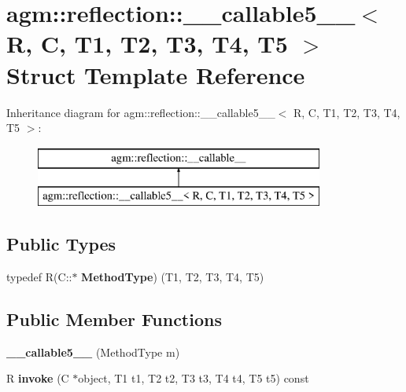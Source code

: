 \hypertarget{structagm_1_1reflection_1_1____callable5____}{}\section{agm\+:\+:reflection\+:\+:\+\_\+\+\_\+callable5\+\_\+\+\_\+$<$ R, C, T1, T2, T3, T4, T5 $>$ Struct Template Reference}
\label{structagm_1_1reflection_1_1____callable5____}
Inheritance diagram for agm\+:\+:reflection\+:\+:\+\_\+\+\_\+callable5\+\_\+\+\_\+$<$ R, C, T1, T2, T3, T4, T5 $>$\+:\begin{figure}[H]
\begin{center}
\leavevmode
\includegraphics[height=2.000000cm]{structagm_1_1reflection_1_1____callable5____}
\end{center}
\end{figure}
\subsection*{Public Types}
\begin{DoxyCompactItemize}
\item 
typedef R(C\+::$\ast$ {\bfseries Method\+Type}) (T1, T2, T3, T4, T5)\hypertarget{structagm_1_1reflection_1_1____callable5_____a8417118cba653d6e2d0fb0104980759c}{}\label{structagm_1_1reflection_1_1____callable5_____a8417118cba653d6e2d0fb0104980759c}

\end{DoxyCompactItemize}
\subsection*{Public Member Functions}
\begin{DoxyCompactItemize}
\item 
{\bfseries \+\_\+\+\_\+callable5\+\_\+\+\_\+} (Method\+Type m)\hypertarget{structagm_1_1reflection_1_1____callable5_____afa2ebe77e38218a8d0910781d073a704}{}\label{structagm_1_1reflection_1_1____callable5_____afa2ebe77e38218a8d0910781d073a704}

\item 
R {\bfseries invoke} (C $\ast$object, T1 t1, T2 t2, T3 t3, T4 t4, T5 t5) const \hypertarget{structagm_1_1reflection_1_1____callable5_____a5f71fd34743be37d7fbd22f96079b90e}{}\label{structagm_1_1reflection_1_1____callable5_____a5f71fd34743be37d7fbd22f96079b90e}

\end{DoxyCompactItemize}
